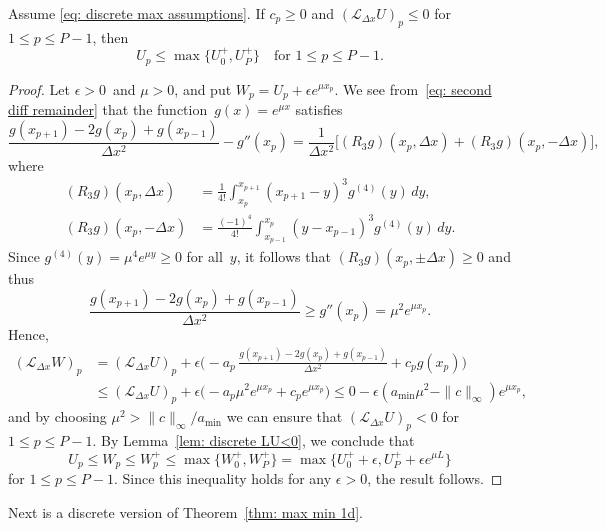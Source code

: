 \begin{theorem}\label{thm: discrete max principle}
Assume \eqref{eq: discrete max assumptions}.
If $c_p\ge0$ and $(\mathcal{L}_{\Delta x}U)_p\le0$ for $1\le p\le P-1$, then 
\[
U_p\le\max\{U_0^+,U_P^+\}\quad\text{for $1\le p\le P-1$.}
\]
\end{theorem}
\begin{proof}
Let $\epsilon>0$~and $\mu>0$, and put $W_p=U_p+\epsilon e^{\mu x_p}$.  
We see from~\eqref{eq: second diff remainder} that the 
function~$g(x)=e^{\mu x}$ satisfies
\[
\frac{g(x_{p+1})-2g(x_p)+g(x_{p-1})}{\Delta x^2}-g''(x_p)
	=\frac{1}{\Delta x^2}\bigl[(R_3g)(x_p,\Delta x)+(R_3g)(x_p,-\Delta x)\bigr],
\]
where
\begin{align*}
(R_3g)(x_p,\Delta x)
	&=\frac{1}{4!}\int_{x_p}^{x_{p+1}}(x_{p+1}-y)^3g^{(4)}(y)\,dy,\\
(R_3g)(x_p,-\Delta x)
	&=\frac{(-1)^4}{4!}\int_{x_{p-1}}^{x_p}(y-x_{p-1})^3g^{(4)}(y)\,dy.
\end{align*}
Since $g^{(4)}(y)=\mu^4e^{\mu y}\ge0$ for all~$y$, it follows that
$(R_3g)(x_p,\pm\Delta x)\ge0$ and thus
\[
\frac{g(x_{p+1})-2g(x_p)+g(x_{p-1})}{\Delta x^2}\ge g''(x_p)=\mu^2e^{\mu x_p}.
\]
Hence, 
\begin{align*}
(\mathcal{L}_{\Delta x}W)_p&=(\mathcal{L}_{\Delta x}U)_p
	+\epsilon\biggl(-a_p\,\frac{g(x_{p+1})-2g(x_p)+g(x_{p-1})}{\Delta x^2}
	+c_pg(x_p)\biggr)\\
	&\le (\mathcal{L}_{\Delta x}U)_p
		+\epsilon\bigl(-a_p\mu^2e^{\mu x_p}+c_pe^{\mu x_p}\bigr)
	\le0-\epsilon(a_{\min}\mu^2-\|c\|_\infty)e^{\mu x_p}, 
\end{align*}
and by choosing $\mu^2>\|c\|_\infty/a_{\min}$ we can ensure that 
$(\mathcal{L}_{\Delta x}U)_p<0$ for~$1\le p\le P-1$.  By 
Lemma~\ref{lem: discrete LU<0}, we conclude that
\[
U_p\le W_p\le W_p^+\le\max\{W_0^+,W_P^+\}
	=\max\{U_0^++\epsilon,U_P^++\epsilon e^{\mu L}\}
\]
for $1\le p\le P-1$.  Since this inequality holds for any $\epsilon>0$, the 
result follows.
\end{proof}

Next is a discrete version of Theorem~\ref{thm: max min 1d}.

